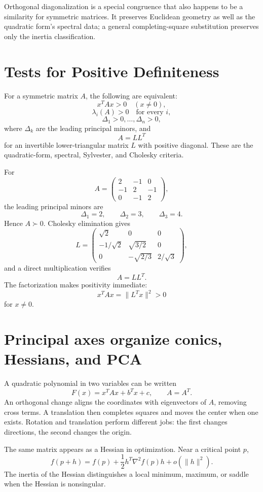Orthogonal diagonalization is a special congruence that also happens to be a similarity for symmetric matrices.  It preserves Euclidean geometry as well as the quadratic form's spectral data; a general completing-square substitution preserves only the inertia classification.

\section{Tests for Positive Definiteness}

For a symmetric matrix \(A\), the following are equivalent:
\[
  x^TAx>0\quad(x\ne0),
\]
\[
  \lambda_i(A)>0\quad\text{for every }i,
\]
\[
  \Delta_1>0,\ldots,\Delta_n>0,
\]
where \(\Delta_k\) are the leading principal minors, and
\[
  A=LL^T
\]
for an invertible lower-triangular matrix \(L\) with positive diagonal.  These are the quadratic-form, spectral, Sylvester, and Cholesky criteria.

For
\[
  A=
  \begin{pmatrix}
    2&-1&0\\
    -1&2&-1\\
    0&-1&2
  \end{pmatrix},
\]
the leading principal minors are
\[
  \Delta_1=2,
  \qquad
  \Delta_2=3,
  \qquad
  \Delta_3=4.
\]
Hence \(A\succ0\).  Cholesky elimination gives
\[
  L=
  \begin{pmatrix}
    \sqrt2&0&0\\
    -1/\sqrt2&\sqrt{3/2}&0\\
    0&-\sqrt{2/3}&2/\sqrt3
  \end{pmatrix},
\]
and a direct multiplication verifies
\[
  A=LL^T.
\]
The factorization makes positivity immediate:
\[
  x^TAx=\|L^Tx\|^2>0
\]
for \(x\ne0\).

\section{Principal axes organize conics, Hessians, and PCA}

A quadratic polynomial in two variables can be written
\[
  F(x)=x^TAx+b^Tx+c,
  \qquad A=A^T.
\]
An orthogonal change aligns the coordinates with eigenvectors of \(A\), removing cross terms.  A translation then completes squares and moves the center when one exists.  Rotation and translation perform different jobs: the first changes directions, the second changes the origin.

The same matrix appears as a Hessian in optimization.  Near a critical point \(p\),
\[
  f(p+h)
  =f(p)+\frac12h^T\nabla^2f(p)h+o(\|h\|^2).
\]
The inertia of the Hessian distinguishes a local minimum, maximum, or saddle when the Hessian is nonsingular.

